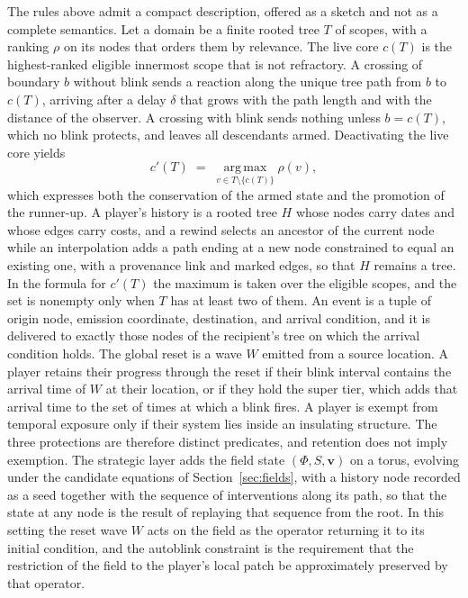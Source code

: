 \documentclass[11pt]{article}
\begin{document}
The rules above admit a compact description, offered as a sketch and not as a complete semantics. Let a domain be a finite rooted tree $T$ of scopes, with a ranking $\rho$ on its nodes that orders them by relevance. The live core $c(T)$ is the highest-ranked eligible innermost scope that is not refractory. A crossing of boundary $b$ without blink sends a reaction along the unique tree path from $b$ to $c(T)$, arriving after a delay $\delta$ that grows with the path length and with the distance of the observer. A crossing with blink sends nothing unless $b = c(T)$, which no blink protects, and leaves all descendants armed. Deactivating the live core yields
\[
c'(T) \;=\; \operatorname*{arg\,max}_{v \in T \setminus \{c(T)\}} \rho(v),
\]
which expresses both the conservation of the armed state and the promotion of the runner-up. A player's history is a rooted tree $H$ whose nodes carry dates and whose edges carry costs, and a rewind selects an ancestor of the current node while an interpolation adds a path ending at a new node constrained to equal an existing one, with a provenance link and marked edges, so that $H$ remains a tree. In the formula for $c'(T)$ the maximum is taken over the eligible scopes, and the set is nonempty only when $T$ has at least two of them. An event is a tuple of origin node, emission coordinate, destination, and arrival condition, and it is delivered to exactly those nodes of the recipient's tree on which the arrival condition holds. The global reset is a wave $W$ emitted from a source location. A player retains their progress through the reset if their blink interval contains the arrival time of $W$ at their location, or if they hold the super tier, which adds that arrival time to the set of times at which a blink fires. A player is exempt from temporal exposure only if their system lies inside an insulating structure. The three protections are therefore distinct predicates, and retention does not imply exemption. The strategic layer adds the field state $(\Phi, S, \mathbf{v})$ on a torus, evolving under the candidate equations of Section~\ref{sec:fields}, with a history node recorded as a seed together with the sequence of interventions along its path, so that the state at any node is the result of replaying that sequence from the root. In this setting the reset wave $W$ acts on the field as the operator returning it to its initial condition, and the autoblink constraint is the requirement that the restriction of the field to the player's local patch be approximately preserved by that operator.
\end{document}
